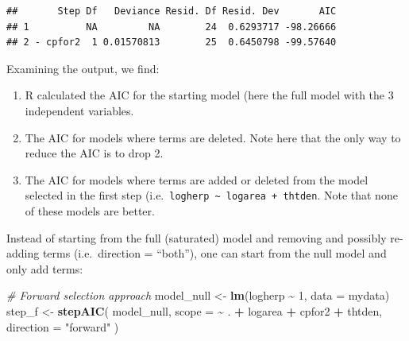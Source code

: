 \documentclass[
  12pt,
]{book}
\newenvironment{Shaded}{\begin{snugshade}}{\end{snugshade}}
\newcommand{\CommentTok}[1]{\textcolor[rgb]{0.56,0.35,0.01}{\textit{#1}}}
\newcommand{\DataTypeTok}[1]{\textcolor[rgb]{0.13,0.29,0.53}{#1}}
\newcommand{\DecValTok}[1]{\textcolor[rgb]{0.00,0.00,0.81}{#1}}
\newcommand{\KeywordTok}[1]{\textcolor[rgb]{0.13,0.29,0.53}{\textbf{#1}}}
\newcommand{\NormalTok}[1]{#1}
\newcommand{\OperatorTok}[1]{\textcolor[rgb]{0.81,0.36,0.00}{\textbf{#1}}}
\newcommand{\StringTok}[1]{\textcolor[rgb]{0.31,0.60,0.02}{#1}}
\providecommand{\tightlist}{%
  \setlength{\itemsep}{0pt}\setlength{\parskip}{0pt}}
\begin{document}
\begin{Shaded}
\end{Shaded}

\begin{verbatim}
##       Step Df   Deviance Resid. Df Resid. Dev       AIC
## 1          NA         NA        24  0.6293717 -98.26666
## 2 - cpfor2  1 0.01570813        25  0.6450798 -99.57640
\end{verbatim}

Examining the output, we find:

\begin{enumerate}
\def\labelenumi{\arabic{enumi}.}
\tightlist
\item
  R calculated the AIC for the starting model (here the full model with the 3 independent variables.
\item
  The AIC for models where terms are deleted. Note here that the only way to reduce the AIC is to drop 2.
\item
  The AIC for models where terms are added or deleted from the model selected in the first step (i.e.~\texttt{logherp\ \textasciitilde{}\ logarea\ +\ thtden}. Note that none of these models are better.
\end{enumerate}

Instead of starting from the full (saturated) model and removing and possibly re-adding terms (i.e.~direction = ``both''), one can start from the null model and only add terms:

\begin{Shaded}
\begin{Highlighting}[]
\CommentTok{\# Forward selection approach}
\NormalTok{model\_null \textless{}{-}}\StringTok{ }\KeywordTok{lm}\NormalTok{(logherp }\OperatorTok{\textasciitilde{}}\StringTok{ }\DecValTok{1}\NormalTok{, }\DataTypeTok{data =}\NormalTok{ mydata)}
\NormalTok{step\_f \textless{}{-}}\StringTok{ }\KeywordTok{stepAIC}\NormalTok{(}
\NormalTok{  model\_null,}
  \DataTypeTok{scope =} \OperatorTok{\textasciitilde{}}\StringTok{ }\NormalTok{. }\OperatorTok{+}\StringTok{ }\NormalTok{logarea }\OperatorTok{+}\StringTok{ }\NormalTok{cpfor2 }\OperatorTok{+}\StringTok{ }\NormalTok{thtden, }\DataTypeTok{direction =} \StringTok{"forward"}
\NormalTok{)}
\end{Highlighting}
\end{Shaded}
\end{document}
